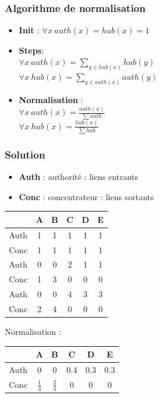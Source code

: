     \subsubsection*{Algorithme de normalisation}

    \begin{itemize}
        \item \textbf{Init} :  $ \forall x \: auth(x) = hub(x) = 1 $
        \item \textbf{Steps}: \\
            $\forall x \: auth(x) = \sum_{y \in hub(x)} hub(y)  $ \\
            $\forall x \: hub(x) = \sum_{y \in auth(x)} auth(y)  $
        \item \textbf{Normalisation} : \\
            $ \forall x \: auth(x) = \frac{auth(x)}{\sum auth} $ \\
            $ \forall x \: hub(x) = \frac{hub(x)}{\sum hub} $
    \end{itemize}

    \subsubsection*{Solution}
    \begin{itemize}
        \item \textbf{Auth} : authorité : liens entrants
        \item \textbf{Conc} : concentrateur : liens sortants
    \end{itemize}

    \begin{center}
    	\begin{tabular}{c|ccccc}
    	     & A & B & C & D & E\\ \hline
    	Auth & 1 & 1 & 1 & 1 & 1\\
    	Conc & 1 & 1 & 1 & 1 & 1\\ \hline
    	Auth & 0 & 0 & 2 & 1 & 1\\
    	Conc & 1 & 3 & 0 & 0 & 0\\ \hline
    	Auth & 0 & 0 & 4 & 3 & 3\\
    	Conc & 2 & 4 & 0 & 0 & 0\\ \hline
    	\end{tabular}
    \end{center}

    Normalisation :
    \begin{center}
    	\begin{tabular}{c|ccccc}
    	     & A & B & C & D & E\\ \hline
    	Auth & 0 & 0 & 0.4 & 0.3 & 0.3\\
    	Conc & $\frac{1}{3}$ & $\frac{2}{3}$ & 0 & 0 & 0\\ \hline
    	\end{tabular}
    \end{center}


